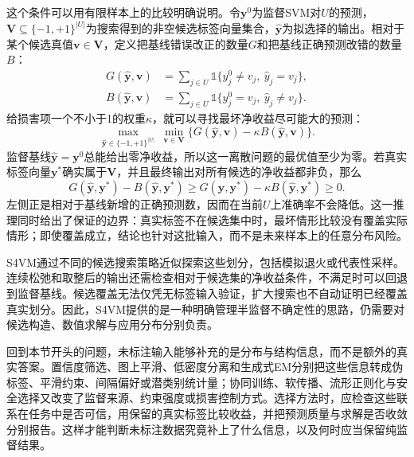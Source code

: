 这个条件可以用有限样本上的比较明确说明。令$\bm{y}^{0}$为监督SVM对$U$的预测，$\bm{V}\subseteq\{-1,+1\}^{|U|}$为搜索得到的非空候选标签向量集合，$\widehat{\bm{y}}$为拟选择的输出。相对于某个候选真值$\bm{v}\in\bm{V}$，定义把基线错误改正的数量$G$和把基线正确预测改错的数量$B$：
\begin{equation}
  \label{eq:classification-s4vm-gain-loss}
  \begin{aligned}
    G(\widehat{\bm{y}},\bm{v})
      &=\sum_{j\in U}
        \mathbb{1}\{y_j^0\ne v_j,\ \widehat y_j=v_j\},\\
    B(\widehat{\bm{y}},\bm{v})
      &=\sum_{j\in U}
        \mathbb{1}\{y_j^0=v_j,\ \widehat y_j\ne v_j\}.
  \end{aligned}
\end{equation}
给损害项一个不小于1的权重$\kappa$，就可以寻找最坏净收益尽可能大的预测：
\begin{equation}
  \label{eq:classification-s4vm-maxmin}
  \max_{\widehat{\bm{y}}\in\{-1,+1\}^{|U|}}
  \ \min_{\bm{v}\in\bm{V}}
  \bigl\{G(\widehat{\bm{y}},\bm{v})
         -\kappa B(\widehat{\bm{y}},\bm{v})\bigr\}.
\end{equation}
监督基线$\widehat{\bm{y}}=\bm{y}^{0}$总能给出零净收益，所以这一离散问题的最优值至少为零。若真实标签向量$\bm{y}^{\ast}$确实属于$\bm{V}$，并且最终输出对所有候选的净收益都非负，那么
\[
  G(\widehat{\bm{y}},\bm{y}^{\ast})
    -B(\widehat{\bm{y}},\bm{y}^{\ast})
  \geq
  G(\widehat{\bm{y}},\bm{y}^{\ast})
    -\kappa B(\widehat{\bm{y}},\bm{y}^{\ast})
  \geq0.
\]
左侧正是相对于基线新增的正确预测数，因而在当前$U$上准确率不会降低。这一推理同时给出了保证的边界：真实标签不在候选集中时，最坏情形比较没有覆盖实际情形；即使覆盖成立，结论也针对这批输入，而不是未来样本上的任意分布风险。

S4VM通过不同的候选搜索策略近似探索这些划分，包括模拟退火或代表性采样。连续松弛和取整后的输出还需检查相对于候选集的净收益条件，不满足时可以回退到监督基线。候选覆盖无法仅凭无标签输入验证，扩大搜索也不自动证明已经覆盖真实划分。因此，S4VM提供的是一种明确管理半监督不确定性的思路，仍需要对候选构造、数值求解与应用分布分别负责。

回到本节开头的问题，未标注输入能够补充的是分布与结构信息，而不是额外的真实答案。置信度筛选、图上平滑、低密度分离和生成式EM分别把这些信息转成伪标签、平滑约束、间隔偏好或潜类别统计量；协同训练、软传播、流形正则化与安全选择又改变了监督来源、约束强度或损害控制方式。选择方法时，应检查这些联系在任务中是否可信，用保留的真实标签比较收益，并把预测质量与求解是否收敛分别报告。这样才能判断未标注数据究竟补上了什么信息，以及何时应当保留纯监督结果。

